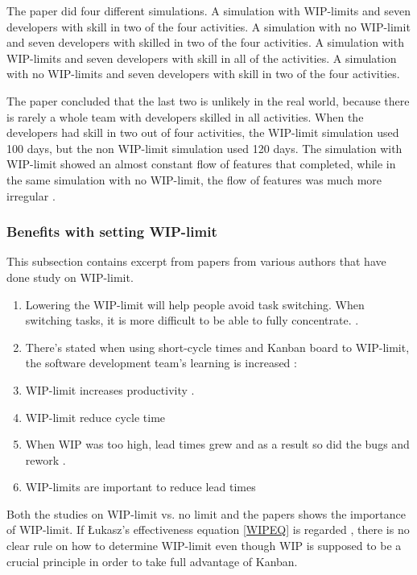 \documentclass[UKenglish]{ifimaster}  %
\begin{document}
The paper did four different simulations.  A simulation with WIP-limits and seven developers with skill in two of the four activities. A simulation with no WIP-limit and seven developers with skilled in two of the four activities. A simulation with WIP-limits and seven developers with skill in all of the activities. A simulation with no WIP-limits and seven developers with skill in two of the four activities.

The paper concluded that the last two is unlikely in the real world, because there is rarely a whole team with developers skilled in all activities. 
When the developers had skill in two out of four activities, the WIP-limit simulation used 100 days, but the non WIP-limit simulation used 120 days. The simulation with WIP-limit showed an almost constant flow of features that completed, while in the same simulation with no WIP-limit, the flow of features was much more irregular \parencite{DavidAnderson}.

\subsubsection{Benefits with setting WIP-limit}
\label{sub:sub:benefits}
This subsection contains excerpt from papers from various authors that have done study on WIP-limit. 

\begin{enumerate}
\item Lowering the WIP-limit will help people avoid task switching. When switching tasks, it is more difficult to be able to fully concentrate. \parencite{Ikonen}.
\item There's stated when using short-cycle times and Kanban board to WIP-limit, the software development team's learning is increased \parencite{Joyce}:
\item WIP-limit increases productivity \parencite{Joyce}.
\item WIP-limit reduce cycle time \parencite{Ola}
\item When WIP was too high, lead times grew and as a result so did the bugs and rework \parencite{Shinkle}.
\vspace{-0.3em}
\item  WIP-limits are important to reduce lead times \parencite{KanbanWay} 
\end{enumerate}

Both the studies on WIP-limit vs. no limit and the papers shows the importance of WIP-limit. If  \L ukasz's effectiveness equation \ref{WIPEQ} is regarded , there is no clear rule on how to determine WIP-limit even though WIP is supposed to be a crucial principle in order to take full advantage of Kanban.
\end{document}
